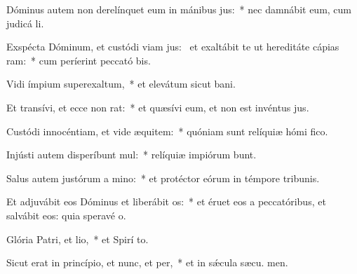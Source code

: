 \item Dóminus autem non derelínquet eum in mánibus jus:~* nec damnábit eum, cum judicá li.
\item Exspécta Dóminum, et custódi viam jus:~\pscross{} et exaltábit te ut hereditáte cápias ram:~* cum períerint peccató bis.
\item Vidi ímpium superexaltum,~* et elevátum sicut  bani.
\item Et transívi, et ecce non rat:~* et quæsívi eum, et non est invéntus  jus.
\item Custódi innocéntiam, et vide æquitem:~* quóniam sunt relíquiæ hómi fico.
\item Injústi autem disperíbunt mul:~* relíquiæ impiórum bunt.
\item Salus autem justórum a mino:~* et protéctor eórum in témpore tribunis.
\item Et adjuvábit eos Dóminus et liberábit os:~* et éruet eos a peccatóribus, et salvábit eos: quia speravé  o.
\item Glória Patri, et lio,~* et Spirí to.
\item Sicut erat in princípio, et nunc, et per,~* et in sǽcula sæcu. men.
